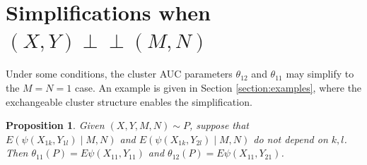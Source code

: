 \documentclass[12pt]{article}
\DeclareMathOperator{\AUC}{AUC}
\newcommand{\E}{E}
\renewcommand{\P}{P}
\newcommand{\cind}{\perp \!\!\! \perp}
\newcommand{\aucindiv}{\theta_{11}}%
\newcommand{\aucpop}{\theta_{12}}%
\newcommand{\kernel}{\psi}
\newtheorem{proposition}[theorem]{Proposition}
\begin{document}
\section{Simplifications when $(X,Y)\cind (M,N)$}\label{section:simplifications}

Under some conditions, the cluster AUC parameters $\aucpop$ and
$\aucindiv$ may simplify to the $M=N=1$ case. An example is given in
Section \ref{section:examples}, where the exchangeable cluster structure
enables the simplification.
\begin{proposition}\label{proposition:reduction} Given
  $(X,Y,M,N)\sim \P$, suppose 
  that $\E(\kernel(X_{1k},Y_{1l})\mid M,N)$ and $\E(\kernel(X_{1k},Y_{2l})\mid M,N)$ do
  not depend on $k,l$. Then $\aucindiv(\P)=\E\kernel(X_{11},Y_{11})$
  and $\aucpop(\P)=\E\kernel(X_{11},Y_{21})$.
\end{proposition}


\end{document}
